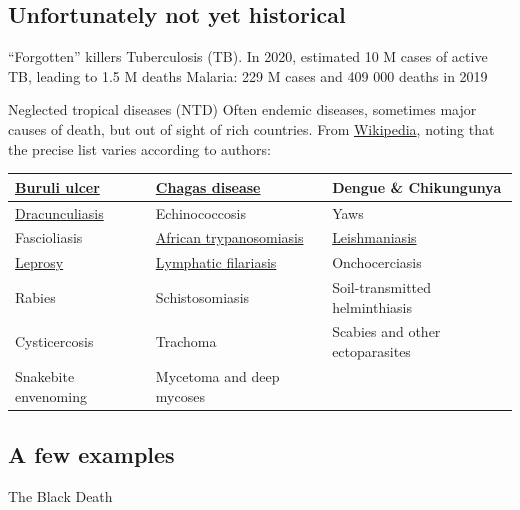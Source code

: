 \documentclass[aspectratio=169]{beamer}\usepackage[]{graphicx}\usepackage[]{xcolor}
\begin{document}
\subsection{Unfortunately not yet historical}
\begin{frame}{``Forgotten'' killers}
\bbullet Tuberculosis (TB). In 2020, estimated 10 M cases of active TB, leading to 1.5 M deaths
\vfill
\bbullet Malaria: 229 M cases and 409 000 deaths in 2019
\end{frame}
    
    
\begin{frame}{Neglected tropical diseases (NTD)}
Often endemic diseases, sometimes major causes of death, but out of sight of rich countries. From \href{https://en.wikipedia.org/wiki/Neglected_tropical_diseases}{Wikipedia}, noting that the precise list varies according to authors:
    
\begin{tabular}{|l|l|l|}
\hline
\href{https://en.wikipedia.org/wiki/Buruli_ulcer}{Buruli ulcer} & \href{https://en.wikipedia.org/wiki/Chagas_disease}{Chagas disease} & Dengue \& Chikungunya \\
\hline
\href{https://en.wikipedia.org/wiki/Dracunculiasis}{Dracunculiasis} & Echinococcosis & Yaws \\
\hline
Fascioliasis & \href{https://en.wikipedia.org/wiki/African_trypanosomiasis}{African trypanosomiasis} & \href{https://en.wikipedia.org/wiki/Leishmaniasis}{Leishmaniasis} \\
\hline
\href{https://en.wikipedia.org/wiki/Leprosy}{Leprosy} & \href{https://en.wikipedia.org/wiki/Lymphatic_filariasis}{Lymphatic filariasis} & Onchocerciasis \\
\hline
Rabies & Schistosomiasis & Soil-transmitted helminthiasis \\
\hline
Cysticercosis & Trachoma & Scabies and other ectoparasites \\
\hline
Snakebite envenoming & Mycetoma and deep mycoses & \\
\hline
\end{tabular}
\end{frame}

\subsection{A few examples}


\begin{frame}{The Black Death}
\end{frame}
\end{document}
